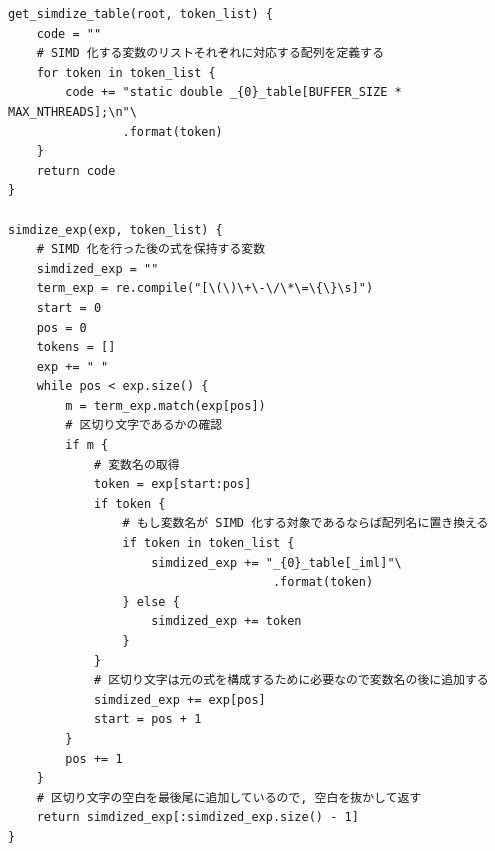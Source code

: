 {\footnotesize
\begin{lstlisting}[title=計算式内の変数の配列化,label=simdization, frame=single]
get_simdize_table(root, token_list) {
    code = ""
    # SIMD 化する変数のリストそれぞれに対応する配列を定義する
    for token in token_list {
        code += "static double _{0}_table[BUFFER_SIZE * MAX_NTHREADS];\n"\
                .format(token)
    }
    return code
}

simdize_exp(exp, token_list) {
    # SIMD 化を行った後の式を保持する変数
    simdized_exp = ""
    term_exp = re.compile("[\(\)\+\-\/\*\=\{\}\s]")
    start = 0
    pos = 0
    tokens = []
    exp += " "
    while pos < exp.size() {
        m = term_exp.match(exp[pos])
        # 区切り文字であるかの確認
        if m {
            # 変数名の取得
            token = exp[start:pos]
            if token {
                # もし変数名が SIMD 化する対象であるならば配列名に置き換える
                if token in token_list {
                    simdized_exp += "_{0}_table[_iml]"\
                                     .format(token)
                } else {
                    simdized_exp += token
                }
            }
            # 区切り文字は元の式を構成するために必要なので変数名の後に追加する
            simdized_exp += exp[pos]
            start = pos + 1
        }
        pos += 1
    }
    # 区切り文字の空白を最後尾に追加しているので, 空白を抜かして返す
    return simdized_exp[:simdized_exp.size() - 1]
}
\end{lstlisting}
}

